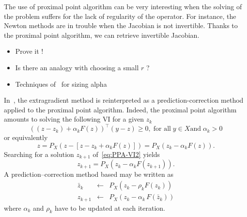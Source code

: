 The use of proximal point algorithm can be very interesting when the solving of the problem suffers for the lack of regularity of the operator. For instance, the Newton methods are in trouble when the Jacobian is not invertible. Thanks to the proximal point algorithm, we can retrieve invertible Jacobian.

\begin{ndrva}
  \begin{itemize}
  \item Prove it !
  \item Is there an analogy with choosing a small $r$ ?
  \item Techniques of~\citep{Han_JCAM2008} for sizing alpha
  \end{itemize}
\end{ndrva}

In~\citep{He.Liao_JOTA2002}, the extragradient method is reinterpreted as a prediction-correction method applied to the proximal point algorithm. Indeed, the proximal point algorithm amounts to solving the following VI for a given $z_k$
\begin{equation}
  \label{eq:PPA-VI1}
  ((z-z_k)+ \alpha_k F(z))^\top(y-z) \geq 0, \;\text{for all}\; y \in X \text{and}\; \alpha_k >0
\end{equation}
or equivalently
\begin{equation}
  \label{eq:PPA-VI2}
  z = P_{X}(z - [z - z_k + \alpha_k F(z)]) = P_{X}( z_k - \alpha_k F(z)).
\end{equation}
Searching for a solution $z_{k+1}$ of~\eqref{eq:PPA-VI2} yields
\begin{equation}
  \label{eq:PPA-VI3}
  z_{k+1} = P_{X}( z_k - \alpha_k F(z_{k+1})).
\end{equation}
A prediction--correction method based may be written as
\begin{equation}
  \label{eq:PPA-VI4}
  \begin{array}{lcl}
    \bar z_{k} &\leftarrow& P_X(z_k-\rho_k F(z_k))\\
    z_{k+1} &\leftarrow& P_X(z_{k}-\alpha_k\,F(\bar z_k))
  \end{array}
\end{equation}
where  $\alpha_k$ and $\rho_k$ have to be updated at each iteration.
\fi



